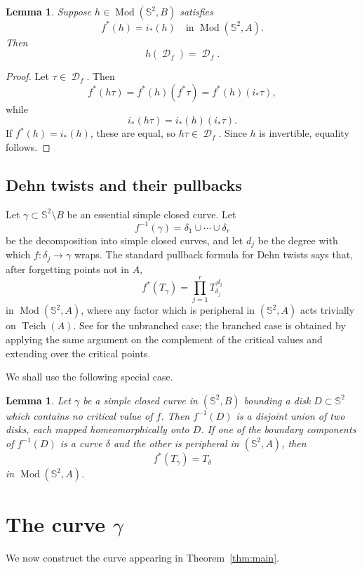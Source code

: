 \documentclass[11pt]{article}
\theoremstyle{plain}
\newtheorem{lemma}[theorem]{Lemma}
\theoremstyle{definition}
\DeclareMathOperator{\Teich}{Teich}
\DeclareMathOperator{\Mod}{Mod}
\DeclareMathOperator{\D}{\mathcal D}
\newcommand{\Sph}{\mathbb S^2}
\begin{document}
\begin{lemma}\label{lem:criterion}
Suppose \(h\in \Mod(\Sph,B)\) satisfies
\[
f^*(h)=i_*(h)\quad\text{in }\Mod(\Sph,A).
\]
Then
\[
h(\D_f)=\D_f.
\]
\end{lemma}

\begin{proof}
Let \(\tau\in\D_f\). Then
\[
f^*(h\tau)=f^*(h)(f^*\tau)=f^*(h)(i_*\tau),
\]
while
\[
i_*(h\tau)=i_*(h)(i_*\tau).
\]
If \(f^*(h)=i_*(h)\), these are equal, so \(h\tau\in\D_f\). Since \(h\) is invertible, equality follows.
\end{proof}

\subsection{Dehn twists and their pullbacks}

Let \(\gamma\subset\Sph\setminus B\) be an essential simple closed curve. Let
\[
f^{-1}(\gamma)=\delta_1\cup\cdots\cup\delta_r
\]
be the decomposition into simple closed curves, and let \(d_j\) be the degree with which \(f:\delta_j\to\gamma\) wraps. The standard pullback formula for Dehn twists says that, after forgetting points not in \(A\),
\[
f^*(T_\gamma)=\prod_{j=1}^r T_{\delta_j}^{\,d_j}
\]
in \(\Mod(\Sph,A)\), where any factor which is peripheral in \((\Sph,A)\) acts trivially on \(\Teich(A)\). See \cite[Chapter 3]{FM} for the unbranched case; the branched case is obtained by applying the same argument on the complement of the critical values and extending over the critical points.

We shall use the following special case.

\begin{lemma}\label{lem:twist-pullback}
Let \(\gamma\) be a simple closed curve in \((\Sph,B)\) bounding a disk \(D\subset\Sph\) which contains no critical value of \(f\). Then \(f^{-1}(D)\) is a disjoint union of two disks, each mapped homeomorphically onto \(D\). If one of the boundary components of \(f^{-1}(D)\) is a curve \(\delta\) and the other is peripheral in \((\Sph,A)\), then
\[
f^*(T_\gamma)=T_\delta
\]
in \(\Mod(\Sph,A)\).
\end{lemma}

\section{The curve \(\gamma\)}

We now construct the curve appearing in Theorem~\ref{thm:main}.
\end{document}
